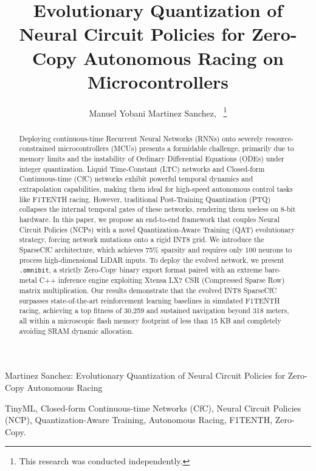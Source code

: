 \documentclass[lettersize,journal]{IEEEtran}
\begin{document}
\title{Evolutionary Quantization of Neural Circuit Policies for Zero-Copy Autonomous Racing on Microcontrollers}

\author{Manuel Yobani Martinez Sanchez,~
\thanks{This research was conducted independently.}}

%
{Martinez Sanchez: Evolutionary Quantization of Neural Circuit Policies for Zero-Copy Autonomous Racing}

\maketitle

\begin{abstract}
Deploying continuous-time Recurrent Neural Networks (RNNs) onto severely resource-constrained microcontrollers (MCUs) presents a formidable challenge, primarily due to memory limits and the instability of Ordinary Differential Equations (ODEs) under integer quantization. Liquid Time-Constant (LTC) networks and Closed-form Continuous-time (CfC) networks exhibit powerful temporal dynamics and extrapolation capabilities, making them ideal for high-speed autonomous control tasks like F1TENTH racing. However, traditional Post-Training Quantization (PTQ) collapses the internal temporal gates of these networks, rendering them useless on 8-bit hardware. In this paper, we propose an end-to-end framework that couples Neural Circuit Policies (NCPs) with a novel Quantization-Aware Training (QAT) evolutionary strategy, forcing network mutations onto a rigid INT8 grid. We introduce the SparseCfC architecture, which achieves 75\% sparsity and requires only 100 neurons to process high-dimensional LiDAR inputs. To deploy the evolved network, we present \texttt{.omnibit}, a strictly Zero-Copy binary export format paired with an extreme bare-metal C++ inference engine exploiting Xtensa LX7 CSR (Compressed Sparse Row) matrix multiplication. Our results demonstrate that the evolved INT8 SparseCfC surpasses state-of-the-art reinforcement learning baselines in simulated F1TENTH racing, achieving a top fitness of 30,259 and sustained navigation beyond 318 meters, all within a microscopic flash memory footprint of less than 15 KB and completely avoiding SRAM dynamic allocation.
\end{abstract}

\begin{IEEEkeywords}
TinyML, Closed-form Continuous-time Networks (CfC), Neural Circuit Policies (NCP), Quantization-Aware Training, Autonomous Racing, F1TENTH, Zero-Copy.
\end{IEEEkeywords}
\end{document}
